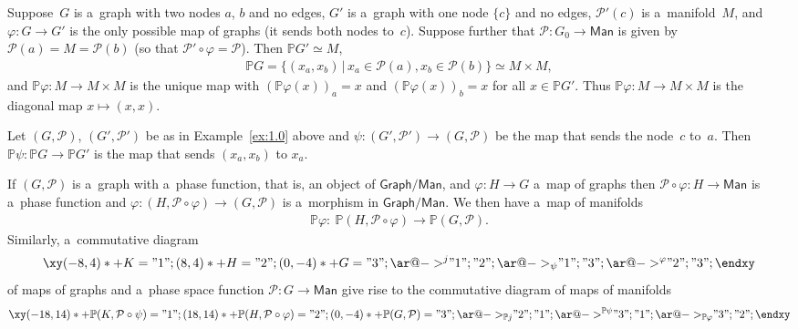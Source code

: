 \documentclass[pdftex]{sigma}
\numberwithin{equation}{section}
\begin{document}
\begin{Example}
\label{ex:1.0}
Suppose~$G$ is a~graph with two nodes $a$, $b$ and no edges, $G'$ is a~graph with one node $\{c\}$ and no edges,
${\mathcal P}'(c)$ is a~manifold~$M$, and $\varphi\colon G\to G'$ is the only possible map of graphs (it sends both
nodes to~$c$).
Suppose further that ${\mathcal P}\colon G_0\to \mathsf{Man}$ is given by ${\mathcal P} (a) = M = {\mathcal P}(b)$ (so
that ${\mathcal P}'\circ \varphi = {\mathcal P}$).
Then $\mathbb{P} G'\simeq M$,
\begin{gather*}
\mathbb{P} G = \{(x_a, x_b) \,|\, x_a\in {\mathcal P} (a), x_b \in {\mathcal P} (b)\} \simeq M\times M,
\end{gather*}
and $\mathbb{P}\varphi\colon M\to M\times M$ is the unique map with $(\mathbb{P} \varphi (x))_a = x$ and $(\mathbb{P}
\varphi (x))_b = x$ for all $x\in \mathbb{P} G'$.
Thus $\mathbb{P} \varphi\colon M\to M\times M$ is the diagonal map $x\mapsto (x,x)$.
\end{Example}

\begin{Example}
Let $(G,{\mathcal P})$, $(G', {\mathcal P}')$ be as in Example~\ref{ex:1.0} above and $\psi\colon (G',{\mathcal P}')\to
(G,{\mathcal P})$ be the map that sends the node~$c$ to~$a$.
Then $\mathbb{P} \psi\colon \mathbb{P} G \to \mathbb{P} G'$ is the map that sends $(x_a, x_b)$ to $x_a$.
\end{Example}

\begin{Remark}
\label{rmrk:2.16}
If $(G,{\mathcal P})$ is a~graph with a~phase function, that is, an object of $\mathsf{Graph}/\mathsf{Man}$, and
$\varphi\colon H\to G$ a~map of graphs then ${\mathcal P}\circ \varphi\colon H\to \mathsf{Man}$ is a~phase function and
$\varphi\colon (H,{\mathcal P}\circ \varphi)\to (G,{\mathcal P})$ is a~morphism in $\mathsf{Graph}/\mathsf{Man}$.
We then have a~map of manifolds
\begin{gather*}
\mathbb{P} \varphi\colon \ \mathbb{P} (H, {\mathcal P}\circ \varphi)\to \mathbb{P} (G,{\mathcal P}).
\end{gather*}
Similarly, a~commutative diagram
\begin{gather*}
\xy
(-8, 4)*+{ K} ="1";
(8, 4)*+{ H} ="2";
(0, -4)*+{G}="3";
{\ar@{->}^{ j} "1";"2"};
{\ar@{->}_{ \psi} "1";"3"};
{\ar@{->}^{\varphi} "2";"3"};
\endxy
\end{gather*}
of maps of graphs and a~phase space function ${\mathcal P}\colon G\to \mathsf{Man}$ give rise to the commutative diagram
of maps of manifolds
\begin{gather*}
\xy
(-18, 14)*+{\mathbb{P} (K, {\mathcal P}\circ \psi) } ="1";
(18, 14)*+{ \mathbb{P} (H, {\mathcal P}\circ \varphi)} ="2";
(0, -4)*+{\mathbb{P}(G,{\mathcal P})}="3";
{\ar@{->}_{ \mathbb{P} j} "2";"1"};
{\ar@{->}^{ \mathbb{P} \psi} "3";"1"};
{\ar@{->}_{\mathbb{P} \varphi} "3";"2"};
\endxy
\end{gather*}

\end{Remark}
\end{document}
